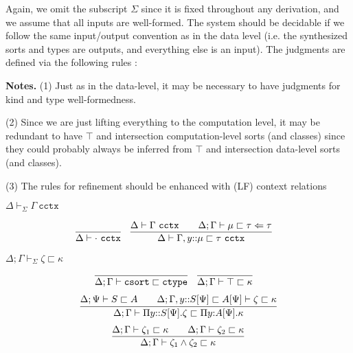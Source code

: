 \documentclass[letterpaper, 11pt]{article}
\newcommand{\Lar}{\Leftarrow}
\newcommand{\ctype}{\texttt{ctype}}
\newcommand{\csort}{\texttt{csort}}
\newcommand{\cctx}{\texttt{cctx}}
\begin{document}
    Again, we omit the subscript $\Sigma$ since it is fixed throughout any derivation, and we assume that all inputs are well-formed.  The system should
    be decidable if we follow the same input/output convention as in the data level (i.e. the synthesized sorts and types are outputs, and everything else
    is an input).  The judgments are defined via the following rules :

    \textbf{Notes.} (1) Just as in the data-level, it may be necessary to have judgments for kind and type well-formedness.

    (2) Since we are just lifting everything to the computation level, it may be redundant to have $\top$ and intersection computation-level sorts (and 
    classes) since they could probably always be inferred from $\top$ and intersection data-level sorts (and classes).

    (3) The rules for refinement should be enhanced with (LF) context relations

    $\boxed{ \Delta \vdash_\Sigma \Gamma \ \cctx}$
    
    \begin{align*}
      & \infer{ \Delta \vdash \cdot \ \cctx}{} &
      & \infer{ \Delta \vdash \Gamma, y{::}\mu \sqsubset \tau \ \cctx}
        {
           \Delta \vdash \Gamma \ \cctx
          &&
           \Delta; \Gamma \vdash \mu \sqsubset \tau \Lar \tau
        }
    \end{align*}

    $\boxed{ \Delta; \Gamma \vdash_\Sigma \zeta \sqsubset \kappa}$
    
    \begin{align*}
      & \infer{ \Delta; \Gamma \vdash \csort \sqsubset \ctype}{} &
      & \infer{ \Delta; \Gamma \vdash \top \sqsubset \kappa}{}
    \end{align*}
    \begin{align*}
      \infer{ \Delta; \Gamma \vdash \Pi y{::}S[\Psi]. \zeta \sqsubset \Pi y{:}A[\Psi]. \kappa}
            {
               \Delta; \Psi \vdash S \sqsubset A
              &&
               \Delta; \Gamma, y{::}S[\Psi] \sqsubset A[\Psi] \vdash \zeta \sqsubset \kappa
            }
    \end{align*}    
    \begin{align*}
      \infer{ \Delta; \Gamma \vdash \zeta_1 \land \zeta_2 \sqsubset \kappa}
            {
               \Delta; \Gamma \vdash \zeta_1 \sqsubset \kappa
              &&
               \Delta; \Gamma \vdash \zeta_2 \sqsubset \kappa
            }
    \end{align*}
\end{document}
